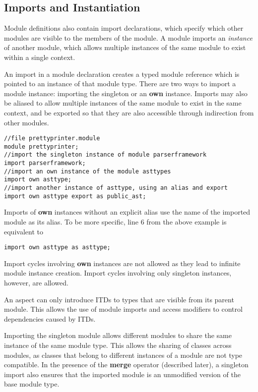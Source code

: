 \subsection{Imports and Instantiation}

Module definitions also contain import declarations, which specify which
other modules are visible to the members of the module. A module imports 
an \textit{instance} of another module, which allows multiple instances
of the same module to exist within a single context.

An import in a module declaration creates a typed module reference which is pointed to
an instance of that module type. 
There are two ways to import a module instance: importing the singleton or
an \textbf{own} instance. Imports may also be aliased to allow multiple instances
of the same module to exist in the same context, and be exported so that
they are also accessible through indirection from other modules.

\begin{lstlisting}[caption={Imports}, label={figure:imports}]
//file prettyprinter.module
module prettyprinter;
//import the singleton instance of module parserframework
import parserframework; 
//import an own instance of the module asttypes
import own asttype;
//import another instance of asttype, using an alias and export
import own asttype export as public_ast;
\end{lstlisting}

Imports of \textbf{own} instances without an explicit alias use the name
of the imported module as its alias. To be more specific, line 6 from the above
example is equivalent to
\begin{lstlisting}
import own asttype as asttype;
\end{lstlisting}

Import cycles involving \textbf{own} instances are not allowed as they
lead to infinite module instance creation. Import cycles involving only
singleton instances, however, are allowed.

An aspect can only introduce ITDs to types that are visible from its parent module. 
This allows the use of module imports and access modifiers to control dependencies
caused by ITDs.

Importing the singleton module allows different modules to share the same instance
of the same module type. This allows the sharing of classes across modules, as
classes that belong to different instances of a module are not type compatible.
In the presence of the \textbf{merge} operator (described later), a singleton import
also ensures that the imported module is an unmodified version of the base module type.

